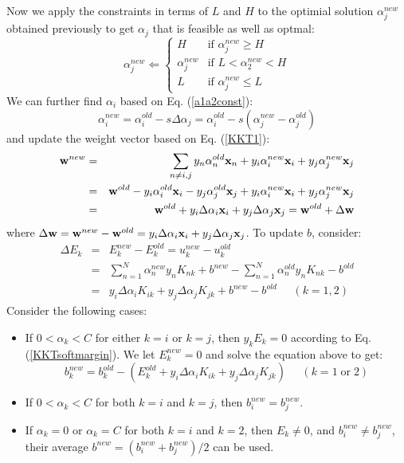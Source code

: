 \documentclass{article}
\begin{document}
Now we apply the constraints in terms of $L$ and $H$ to the optimial
solution $\alpha_j^{new}$ obtained previously to get $\alpha_j$ that 
is feasible as well as optmal:
\begin{equation}
  \alpha_j^{new}\Longleftarrow \left\{\begin{array}{cl}
  H & \mbox{if }\alpha_j^{new}\ge H\\ 
  \alpha_j^{new} & \mbox{if } L<\alpha_2^{new} < H\\
  L & \mbox{if } \alpha_j^{new}\le L\end{array}\right.
\end{equation}
We can further find $\alpha_i$ based on Eq. (\ref{a1a2const}):
\begin{equation}
  \alpha_i^{new}=\alpha_i^{old}-s\Delta\alpha_j
  =\alpha_i^{old}-s(\alpha_j^{new}-\alpha_j^{old})
\end{equation}
and update the weight vector based on Eq. (\ref{KKT1}):
\begin{eqnarray}
  {\bf w}^{new}&=&\sum_{n\ne i,j} y_n\alpha_n^{old}{\bf x}_n
  +y_i\alpha_i^{new}{\bf x}_i+y_j\alpha_j^{new}{\bf x}_j
  \nonumber\\
  &=&{\bf w}^{old}-y_i\alpha_i^{old}{\bf x}_i-y_j\alpha_j^{old}{\bf x}_j
  +y_i\alpha_i^{new}{\bf x}_i+y_j\alpha_j^{new}{\bf x}_j
  \nonumber\\
  &=&{\bf w}^{old}+y_i\Delta\alpha_i{\bf x}_i+y_j\Delta\alpha_j{\bf x}_j
  ={\bf w}^{old}+\Delta{\bf w}
\end{eqnarray}
where $\Delta{\bf w}={\bf w}^{new}-{\bf w}^{old}
=y_i\Delta\alpha_i{\bf x}_i+y_j\Delta\alpha_j{\bf x}_j$.
To update $b$, consider:
\begin{eqnarray}
  \Delta E_k&=&E_k^{new}-E_k^{old}=u_k^{new}-u_k^{old}
  \nonumber\\
  &=&\sum_{n=1}^N\alpha_n^{new}y_nK_{nk}+b^{new}
  -\sum_{n=1}^N\alpha_n^{old}y_nK_{nk}-b^{old}
  \nonumber\\
  &=&y_i\Delta\alpha_iK_{ik}+y_j\Delta\alpha_jK_{jk}
  +b^{new}-b^{old} \;\;\;\;\;(k=1,2)
\end{eqnarray}
Consider the following cases:
\begin{itemize}
\item If $0<\alpha_k<C$ for either $k=i$ or $k=j$, then $y_kE_k=0$ 
  according to Eq. (\ref{KKTsoftmargin}). We let $E_k^{new}=0$ and 
  solve the equation above to get:
  \begin{equation}
    b^{new}_k=b^{old}_k-(E_k^{old}+y_i\Delta\alpha_iK_{ik}+y_j\Delta\alpha_jK_{jk})
    \;\;\;\;\;(k=1\;\mbox{or}\;2)
  \end{equation}
\item If $0<\alpha_k<C$ for both $k=i$ and $k=j$, then $b_i^{new}=b_j^{new}$.
\item If $\alpha_k=0$ or $\alpha_k=C$ for both $k=i$ and $k=2$, 
  then $E_k\ne 0$, and $b^{new}_i\ne b^{new}_j$, their average 
  $b^{new}=(b_i^{new}+b_j^{new})/2$ can be used.
\end{itemize}
\end{document}
